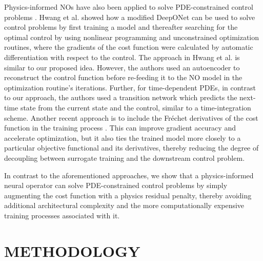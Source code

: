 \documentclass[final,1p,times]{elsarticle}
\theoremstyle{plain} %
\theoremstyle{definition} %
\theoremstyle{remark} %
\begin{document}
Physics-informed NOs have also been applied to solve PDE-constrained control problems \cite{Yong2024Deep,Yong2024DeepMRM,Qi2024}. Hwang et al. \cite{Hwang2022} showed how a modified DeepONet can be used to solve control problems by first training a model and thereafter searching for the optimal control by using nonlinear programming and unconstrained optimization routines, where the gradients of the cost function were calculated by automatic differentiation with respect to the control. The approach in Hwang et al. \cite{Hwang2022} is similar to our proposed idea. However, the authors used an autoencoder to reconstruct the control function before re-feeding it to the NO model in the optimization routine's iterations. Further, for time-dependent PDEs,  in contrast to our approach, the authors used a transition network which predicts the next-time state from the current state and the control, similar to a time-integration scheme. Another recent approach is to include the Fréchet derivatives of the cost function in the training process \cite{cheng2025accelerating,luo2025efficient,yao2025difno}. This can improve gradient accuracy and accelerate optimization, but it also ties the trained model more closely to a particular objective functional and its derivatives, thereby reducing the degree of decoupling between surrogate training and the downstream control problem.

In contrast to the aforementioned approaches, we show that a physics-informed neural operator can solve PDE-constrained control problems by simply augmenting the cost function with a physics residual penalty, thereby avoiding additional architectural complexity and the more computationally expensive training processes associated with it.

\section{METHODOLOGY} \label{section_3}
\end{document}
